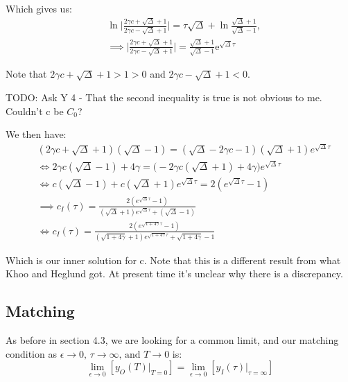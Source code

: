 \documentclass[12pt]{article}
\begin{document}
Which gives us:
\begin{align}
&\ln \bigg|\frac{2\gamma c + \sqrt{\Delta}+1}
                {2\gamma c - \sqrt{\Delta}+1} \bigg|
 = \tau \sqrt{\Delta} + \ln \frac{\sqrt{\Delta}+1}{{\sqrt{\Delta}-1}},\\
&\implies \bigg|\frac{2\gamma c + \sqrt{\Delta}+1}
                     {2\gamma c - \sqrt{\Delta}+1} \bigg|
 = \frac{\sqrt{\Delta}+1}{{\sqrt{\Delta}-1}} \mathrm{e}^{\sqrt{\Delta} \tau}
\end{align}

Note that $2 \gamma c + \sqrt{\Delta} + 1 > 1 > 0$ and
$2 \gamma c - \sqrt{\Delta} + 1 < 0$.

TODO: Ask Y 4 - That the second inequality is true is not obvious to
me. Couldn't c be $C_0$?

We then have:
\begin{align}
&(2\gamma c + \sqrt{\Delta} + 1)(\sqrt{\Delta} - 1) =
   (\sqrt{\Delta} - 2\gamma c - 1)(\sqrt{\Delta} + 1) e^{\sqrt{\Delta} \tau} \\
&\iff 2\gamma c (\sqrt{\Delta} - 1) + 4 \gamma =
  \Big( -2\gamma c(\sqrt{\Delta} + 1) + 4\gamma \Big) e^{\sqrt{\Delta} \tau} \\
&\iff c (\sqrt{\Delta} - 1) + c (\sqrt{\Delta} + 1) e^{\sqrt{\Delta} \tau} =
   2(e^{\sqrt{\Delta} \tau} - 1) \\
&\implies c_I(\tau) =
  \frac{2(e^{\sqrt{\Delta} \tau} - 1)}
       {  (\sqrt{\Delta} + 1) e^{\sqrt{\Delta} \tau} + (\sqrt{\Delta} - 1)} \\
&\iff c_I(\tau) =
  \frac{2(e^{\sqrt{1+4\gamma} \tau} - 1)}
       {(\sqrt{1+4\gamma} + 1) e^{\sqrt{1+4\gamma} \tau} + \sqrt{1+4\gamma} - 1}
\end{align}

Which is our inner solution for c. Note that this is a different
result from what Khoo and Heglund got. At present time it's unclear
why there is a discrepancy.

\subsection{Matching}

As before in section 4.3, we are looking for a common limit, and our
matching condition as
$\epsilon \to 0 \text{, } \tau \to \infty \text{, and } T \to 0$ is:
\begin{equation}
\lim_{\epsilon \to 0} [y_O(T) |_{T=0}] =
\lim_{\epsilon \to 0} [y_I(\tau) |_{\tau=\infty}]
\end{equation}
\end{document}
